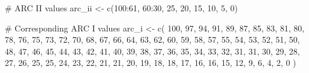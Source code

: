 \documentclass[
  letterpaper,
  DIV=11,
  numbers=noendperiod]{scrartcl}
\newenvironment{Shaded}{\begin{snugshade}}{\end{snugshade}}
\newcommand{\CommentTok}[1]{\textcolor[rgb]{0.37,0.37,0.37}{#1}}
\newcommand{\DecValTok}[1]{\textcolor[rgb]{0.68,0.00,0.00}{#1}}
\newcommand{\FunctionTok}[1]{\textcolor[rgb]{0.28,0.35,0.67}{#1}}
\newcommand{\NormalTok}[1]{\textcolor[rgb]{0.00,0.23,0.31}{#1}}
\newcommand{\OtherTok}[1]{\textcolor[rgb]{0.00,0.23,0.31}{#1}}
\newcommand{\SpecialCharTok}[1]{\textcolor[rgb]{0.37,0.37,0.37}{#1}}
\begin{document}
\begin{Shaded}
\begin{Highlighting}[]
\CommentTok{\# ARC II values}
\NormalTok{arc\_ii }\OtherTok{\textless{}{-}} \FunctionTok{c}\NormalTok{(}\DecValTok{100}\SpecialCharTok{:}\DecValTok{61}\NormalTok{, }\DecValTok{60}\SpecialCharTok{:}\DecValTok{30}\NormalTok{, }\DecValTok{25}\NormalTok{, }\DecValTok{20}\NormalTok{, }\DecValTok{15}\NormalTok{, }\DecValTok{10}\NormalTok{, }\DecValTok{5}\NormalTok{, }\DecValTok{0}\NormalTok{)}

\CommentTok{\# Corresponding ARC I values}
\NormalTok{arc\_i }\OtherTok{\textless{}{-}} \FunctionTok{c}\NormalTok{(}
  \DecValTok{100}\NormalTok{, }\DecValTok{97}\NormalTok{, }\DecValTok{94}\NormalTok{, }\DecValTok{91}\NormalTok{, }\DecValTok{89}\NormalTok{, }\DecValTok{87}\NormalTok{, }\DecValTok{85}\NormalTok{, }\DecValTok{83}\NormalTok{, }\DecValTok{81}\NormalTok{, }\DecValTok{80}\NormalTok{,}
   \DecValTok{78}\NormalTok{, }\DecValTok{76}\NormalTok{, }\DecValTok{75}\NormalTok{, }\DecValTok{73}\NormalTok{, }\DecValTok{72}\NormalTok{, }\DecValTok{70}\NormalTok{, }\DecValTok{68}\NormalTok{, }\DecValTok{67}\NormalTok{, }\DecValTok{66}\NormalTok{, }\DecValTok{64}\NormalTok{,}
   \DecValTok{63}\NormalTok{, }\DecValTok{62}\NormalTok{, }\DecValTok{60}\NormalTok{, }\DecValTok{59}\NormalTok{, }\DecValTok{58}\NormalTok{, }\DecValTok{57}\NormalTok{, }\DecValTok{55}\NormalTok{, }\DecValTok{54}\NormalTok{, }\DecValTok{53}\NormalTok{, }\DecValTok{52}\NormalTok{,}
   \DecValTok{51}\NormalTok{, }\DecValTok{50}\NormalTok{, }\DecValTok{48}\NormalTok{, }\DecValTok{47}\NormalTok{, }\DecValTok{46}\NormalTok{, }\DecValTok{45}\NormalTok{, }\DecValTok{44}\NormalTok{, }\DecValTok{43}\NormalTok{, }\DecValTok{42}\NormalTok{, }\DecValTok{41}\NormalTok{,}
   \DecValTok{40}\NormalTok{, }\DecValTok{39}\NormalTok{, }\DecValTok{38}\NormalTok{, }\DecValTok{37}\NormalTok{, }\DecValTok{36}\NormalTok{, }\DecValTok{35}\NormalTok{, }\DecValTok{34}\NormalTok{, }\DecValTok{33}\NormalTok{, }\DecValTok{32}\NormalTok{, }\DecValTok{31}\NormalTok{,}
   \DecValTok{31}\NormalTok{, }\DecValTok{30}\NormalTok{, }\DecValTok{29}\NormalTok{, }\DecValTok{28}\NormalTok{, }\DecValTok{27}\NormalTok{, }\DecValTok{26}\NormalTok{, }\DecValTok{25}\NormalTok{, }\DecValTok{25}\NormalTok{, }\DecValTok{24}\NormalTok{, }\DecValTok{23}\NormalTok{,}
   \DecValTok{22}\NormalTok{, }\DecValTok{21}\NormalTok{, }\DecValTok{21}\NormalTok{, }\DecValTok{20}\NormalTok{, }\DecValTok{19}\NormalTok{, }\DecValTok{18}\NormalTok{, }\DecValTok{18}\NormalTok{, }\DecValTok{17}\NormalTok{, }\DecValTok{16}\NormalTok{, }\DecValTok{16}\NormalTok{,}
   \DecValTok{15}\NormalTok{, }\DecValTok{12}\NormalTok{,  }\DecValTok{9}\NormalTok{,  }\DecValTok{6}\NormalTok{,  }\DecValTok{4}\NormalTok{,  }\DecValTok{2}\NormalTok{,  }\DecValTok{0}
\NormalTok{)}


\end{Highlighting}
\end{Shaded}
\end{document}
